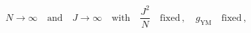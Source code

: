 \begin{equation}
N\to\infty\quad\text{and}\quad J\to\infty\quad\text{with}\quad\frac{J^2}{N}\quad
\text{fixed}\,,\quad g_{\text{YM}}\quad\text{fixed}\,,
\end{equation}

